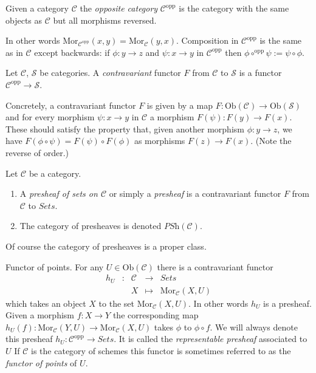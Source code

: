 \begin{definition}
\label{definition-opposite}
Given a category $\mathcal{C}$ the {\it opposite category}
$\mathcal{C}^{\text{opp}}$ is the category with the same objects
as $\mathcal{C}$ but all morphisms reversed.
\end{definition}

\noindent
In other
words $\text{Mor}_{\mathcal{C}^{\text{opp}}}(x, y) =
\text{Mor}_{\mathcal{C}}(y, x)$. Composition in $\mathcal{C}^{\text{opp}}$
is the same as in $\mathcal{C}$ except backwards: if $\phi : y \to z$ and
$\psi : x \to y$ in $\mathcal{C}^{\text{opp}}$ then
$\phi \circ^{\text{opp}} \psi := \psi \circ \phi$.

\begin{definition}
\label{definition-contravariant}
Let $\mathcal{C}$, $\mathcal{S}$ be categories.
A {\it contravariant} functor $F$
from $\mathcal{C}$ to $\mathcal{S}$
is a functor $\mathcal{C}^{\text{opp}}\to \mathcal{S}$.
\end{definition}

\noindent
Concretely, a contravariant functor $F$ is given
by a map $F : \text{Ob}(\mathcal{C}) \to
\text{Ob}(\mathcal{S})$ and for every morphism
$\psi : x \to y$ in $\mathcal{C}$ a morphism
$F(\psi) : F(y) \to F(x)$. These should satisfy the property
that, given another morphism
$\phi : y \to z$, we have $F(\phi \circ \psi)
= F(\psi) \circ F(\phi)$ as morphisms $F(z) \to F(x)$.
(Note the reverse of order.)

\begin{definition}
\label{definition-presheaf}
Let $\mathcal{C}$ be a category.
\begin{enumerate}
\item A {\it presheaf of sets on $\mathcal{C}$}
or simply a {\it presheaf} is a contravariant functor
$F$ from $\mathcal{C}$ to $\textit{Sets}$.
\item The category of presheaves is denoted $\textit{PSh}(\mathcal{C})$.
\end{enumerate}
\end{definition}

\noindent
Of course the category of presheaves is a proper class.

\begin{example}
\label{example-hom-functor}
Functor of points.
For any $U\in \text{Ob}(\mathcal{C})$ there is a contravariant
functor
$$
\begin{matrix}
h_U & : & \mathcal{C}
&
\longrightarrow
&
\textit{Sets} \\
&&
X
&
\longmapsto
&
\text{Mor}_{\mathcal{C}}(X, U)
\end{matrix}
$$
which takes an object $X$ to the set
$\text{Mor}_{\mathcal{C}}(X, U)$. In other words $h_U$ is a presheaf.
Given a morphism $f : X\to Y$ the corresponding map
$h_U(f) :  \text{Mor}_{\mathcal{C}}(Y, U)\to \text{Mor}_{\mathcal{C}}(X, U)$
takes $\phi$ to $\phi\circ f$. We will always denote
this presheaf $h_U : \mathcal{C}^{\text{opp}} \to \textit{Sets}$.
It is called the {\it representable presheaf} associated to $U$
If $\mathcal{C}$ is the category of schemes this functor is
sometimes referred to as the
\emph{functor of points} of $U$.
\end{example}

